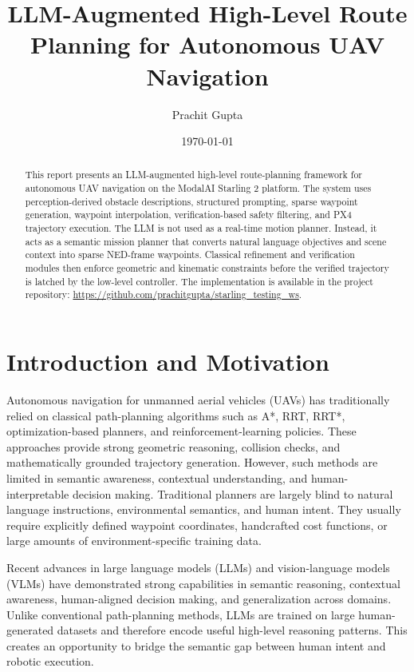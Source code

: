 \documentclass[11pt]{article}
\title{\textbf{LLM-Augmented High-Level Route Planning for Autonomous UAV Navigation}}
\author{Prachit Gupta}
\date{\today}
\begin{document}
\maketitle

\begin{abstract}
This report presents an LLM-augmented high-level route-planning framework for autonomous UAV navigation on the ModalAI Starling 2 platform. The system uses perception-derived obstacle descriptions, structured prompting, sparse waypoint generation, waypoint interpolation, verification-based safety filtering, and PX4 trajectory execution. The LLM is not used as a real-time motion planner. Instead, it acts as a semantic mission planner that converts natural language objectives and scene context into sparse NED-frame waypoints. Classical refinement and verification modules then enforce geometric and kinematic constraints before the verified trajectory is latched by the low-level controller. The implementation is available in the project repository:
\url{https://github.com/prachitgupta/starling_testing_ws}.
\end{abstract}

\section{Introduction and Motivation}

Autonomous navigation for unmanned aerial vehicles (UAVs) has traditionally relied on classical path-planning algorithms such as A*, RRT, RRT*, optimization-based planners, and reinforcement-learning policies. These approaches provide strong geometric reasoning, collision checks, and mathematically grounded trajectory generation. However, such methods are limited in semantic awareness, contextual understanding, and human-interpretable decision making. Traditional planners are largely blind to natural language instructions, environmental semantics, and human intent. They usually require explicitly defined waypoint coordinates, handcrafted cost functions, or large amounts of environment-specific training data.

Recent advances in large language models (LLMs) and vision-language models (VLMs) have demonstrated strong capabilities in semantic reasoning, contextual awareness, human-aligned decision making, and generalization across domains. Unlike conventional path-planning methods, LLMs are trained on large human-generated datasets and therefore encode useful high-level reasoning patterns. This creates an opportunity to bridge the semantic gap between human intent and robotic execution.
\end{document}

